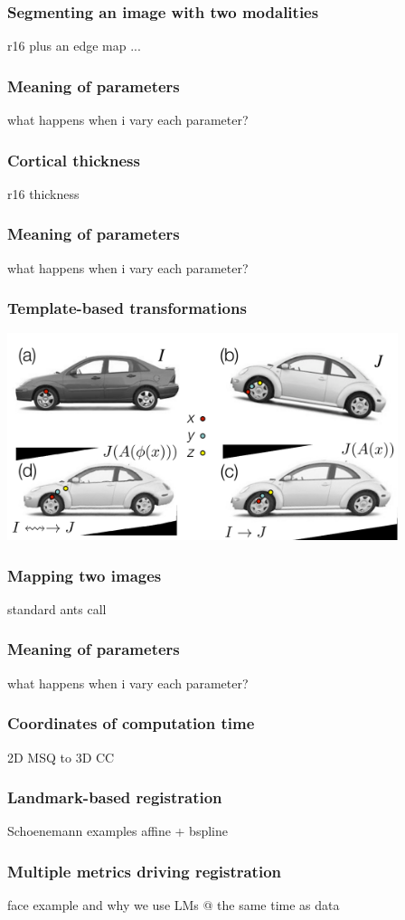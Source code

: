 \documentclass[18pt]{beamer}
\begin{document}
\begin{frame}
\frametitle{Segmenting an image with two modalities}
r16 plus an edge map ... 
\end{frame}

\begin{frame}
\frametitle{Meaning of parameters}
what happens when i vary each parameter?
\end{frame}

\begin{frame}
\frametitle{Cortical thickness}
r16 thickness 
\end{frame}

\begin{frame}
\frametitle{Meaning of parameters}
what happens when i vary each parameter?
\end{frame}

\begin{frame}
\frametitle{Template-based transformations}
\includegraphics[width=4.5in]{../figures/car_example.pdf}
\end{frame}


\begin{frame}
\frametitle{Mapping two images}
standard ants call 
\end{frame}

\begin{frame}
\frametitle{Meaning of parameters}
what happens when i vary each parameter?
\end{frame}

\begin{frame}
\frametitle{Coordinates of computation time}
2D MSQ to 3D CC
\end{frame}

\begin{frame}
\frametitle{Landmark-based registration}
Schoenemann examples affine + bspline 
\end{frame}

\begin{frame}
\frametitle{Multiple metrics driving registration}
face example and why we use LMs @ the same time as data 
\end{frame}
\end{document}
